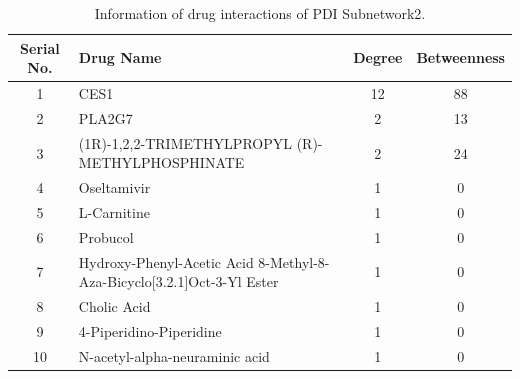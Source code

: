 \begin{table}[H]
\centering
\caption{Information of drug interactions of PDI Subnetwork2.}
\label{tab:drug_interactions_subnet2}
\renewcommand{\arraystretch}{1.2} %
\small
\begin{tabularx}{\textwidth}{|c|X|c|c|}
\hline
\textbf{Serial No.} & \textbf{Drug Name} & \textbf{Degree} & \textbf{Betweenness} \\
\hline
1 & CES1 & 12 & 88 \\
\hline
2 & PLA2G7 & 2 & 13 \\
\hline
3 & (1R)-1,2,2-TRIMETHYLPROPYL (R)-METHYLPHOSPHINATE & 2 & 24 \\
\hline
4 & Oseltamivir & 1 & 0 \\
\hline
5 & L-Carnitine & 1 & 0 \\
\hline
6 & Probucol & 1 & 0 \\
\hline
7 & Hydroxy-Phenyl-Acetic Acid 8-Methyl-8-Aza-Bicyclo[3.2.1]Oct-3-Yl Ester & 1 & 0 \\
\hline
8 & Cholic Acid & 1 & 0 \\
\hline
9 & 4-Piperidino-Piperidine & 1 & 0 \\
\hline
10 & N-acetyl-alpha-neuraminic acid & 1 & 0 \\
\hline
\end{tabularx}
\end{table}


